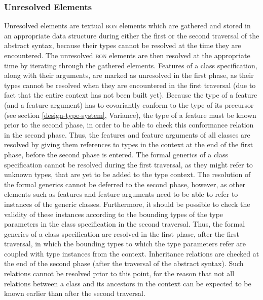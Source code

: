 \subsubsection{Unresolved Elements}
\label{implementation-unresolved-elements}
\label{implementation-unresolved-elements}
Unresolved elements are textual \textsc{bon} elements which are gathered and stored in an appropriate data structure during either the first or the second traversal of the abstract syntax, because their types cannot be resolved at the time they are encountered. The unresolved \textsc{bon} elements are then resolved at the appropriate time by iterating through the gathered elements.
Features of a class specification, along with their arguments, are marked as unresolved in the first phase, as their types cannot be resolved when they are encountered in the first traversal (due to fact that the entire context has not been built yet). Because the type of a feature (and a feature argument) has to covariantly conform to the type of its precursor (see section \ref{design-type-system}, Variance), the type of a feature must be known prior to the second phase, in order to be able to check this conformance relation in the second phase. Thus, the features and feature arguments of all classes are resolved by giving them references to types in the context at the end of the first phase, before the second phase is entered.
The formal generics 	of a class specification cannot be resolved during the first traversal, as they might refer to unknown types, that are yet to be added to the type context. The resolution of the formal generics cannot be deferred to the second phase, however, as other elements such as features and feature arguments need to be able to refer to instances of the generic classes. Furthermore, it should be possible to check the validity of these instances according to the bounding types of the type parameters in the class specification in the second traversal. Thus, the formal generics of a class specification are resolved in the first phase, after the first traversal, in which the bounding types to which the type parameters refer are coupled with type instances from the context.
Inheritance relations are checked at the end of the second phase (after the traversal of the abstract syntax). Such relations cannot be resolved prior to this point, for the reason that not all relations between a class and its ancestors in the context can be expected to be known earlier than after the second traversal.
